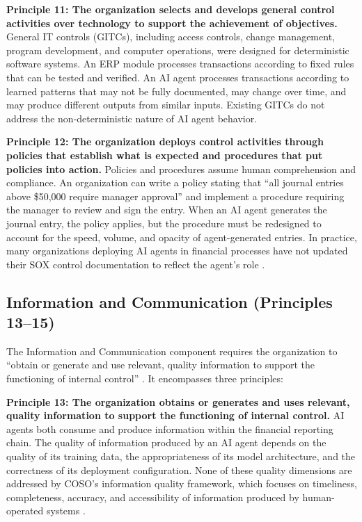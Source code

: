 \documentclass[12pt]{article}
\begin{document}
\textbf{Principle 11: The organization selects and develops general control activities over technology to support the achievement of objectives.} General IT controls (GITCs), including access controls, change management, program development, and computer operations, were designed for deterministic software systems. An ERP module processes transactions according to fixed rules that can be tested and verified. An AI agent processes transactions according to learned patterns that may not be fully documented, may change over time, and may produce different outputs from similar inputs. Existing GITCs do not address the non-deterministic nature of AI agent behavior.

\textbf{Principle 12: The organization deploys control activities through policies that establish what is expected and procedures that put policies into action.} Policies and procedures assume human comprehension and compliance. An organization can write a policy stating that ``all journal entries above \$50,000 require manager approval'' and implement a procedure requiring the manager to review and sign the entry. When an AI agent generates the journal entry, the policy applies, but the procedure must be redesigned to account for the speed, volume, and opacity of agent-generated entries. In practice, many organizations deploying AI agents in financial processes have not updated their SOX control documentation to reflect the agent's role \citep{ey2025controllership}.

\subsection{Information and Communication (Principles 13--15)}

The Information and Communication component requires the organization to ``obtain or generate and use relevant, quality information to support the functioning of internal control'' \citep{coso2013}. It encompasses three principles:

\textbf{Principle 13: The organization obtains or generates and uses relevant, quality information to support the functioning of internal control.} AI agents both consume and produce information within the financial reporting chain. The quality of information produced by an AI agent depends on the quality of its training data, the appropriateness of its model architecture, and the correctness of its deployment configuration. None of these quality dimensions are addressed by COSO's information quality framework, which focuses on timeliness, completeness, accuracy, and accessibility of information produced by human-operated systems \citep{coso2013}.
\end{document}
